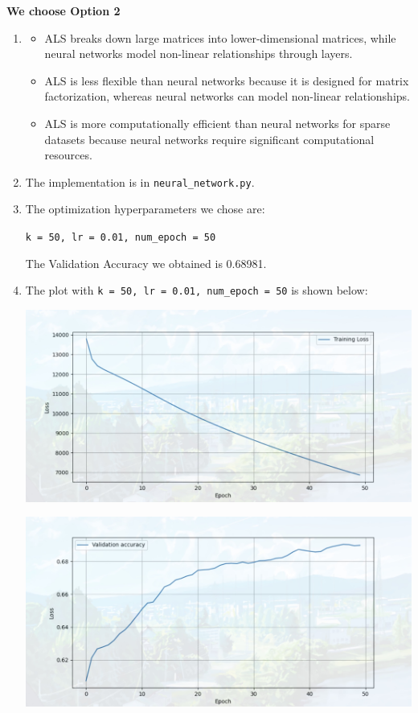 \documentclass{article}
\begin{document}
\textbf{We choose Option 2}
\begin{enumerate}[label=(\alph*)]
    \item 
    \begin{itemize}
        \item ALS breaks down large matrices into lower-dimensional matrices, while neural networks model non-linear relationships through layers.
        
        \item ALS is less flexible than neural networks because it is designed for matrix factorization, whereas neural networks can model non-linear relationships.
        
        \item ALS is more computationally efficient than neural networks for sparse datasets because neural networks require significant computational resources.
    \end{itemize}

    \item The implementation is in \texttt{neural\_network.py}.
    
    \item The optimization hyperparameters we chose are:
    
    \texttt{k = 50, lr = 0.01, num\_epoch = 50}

    The Validation Accuracy we obtained is 0.68981.

    \item The plot with \texttt{k = 50, lr = 0.01, num\_epoch = 50} is shown below:
    
    \includegraphics[width=0.7\linewidth]{6031723149317_.pic.jpg}

    \includegraphics[width=0.7\linewidth]{6041723149328_.pic.jpg}


\end{enumerate}
\end{document}
